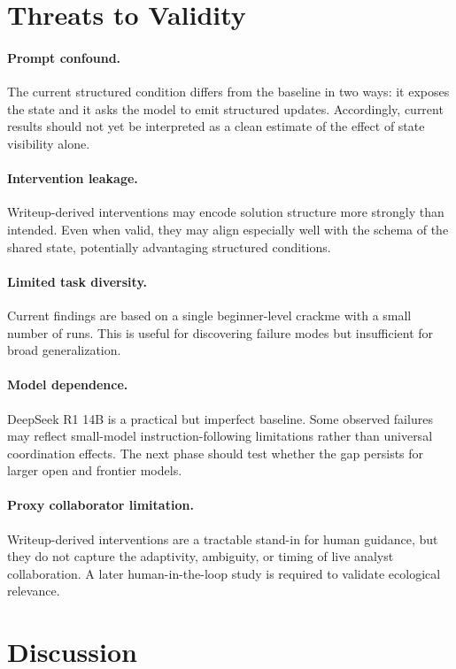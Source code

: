 \documentclass[letterpaper]{article}
\begin{document}
\section{Threats to Validity}

\paragraph{Prompt confound.}
The current structured condition differs from the baseline in two ways: it exposes the state and it asks the model to emit structured updates.
Accordingly, current results should not yet be interpreted as a clean estimate of the effect of state visibility alone.

\paragraph{Intervention leakage.}
Writeup-derived interventions may encode solution structure more strongly than intended.
Even when valid, they may align especially well with the schema of the shared state, potentially advantaging structured conditions.

\paragraph{Limited task diversity.}
Current findings are based on a single beginner-level crackme with a small number of runs.
This is useful for discovering failure modes but insufficient for broad generalization.

\paragraph{Model dependence.}
DeepSeek R1 14B is a practical but imperfect baseline.
Some observed failures may reflect small-model instruction-following limitations rather than universal coordination effects.
The next phase should test whether the gap persists for larger open and frontier models.

\paragraph{Proxy collaborator limitation.}
Writeup-derived interventions are a tractable stand-in for human guidance, but they do not capture the adaptivity, ambiguity, or timing of live analyst collaboration.
A later human-in-the-loop study is required to validate ecological relevance.

\section{Discussion}
\end{document}
